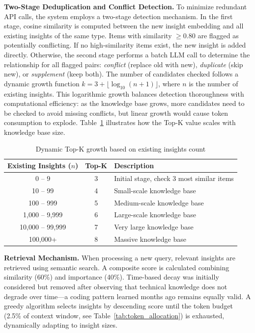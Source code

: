 \documentclass{article} %
\begin{document}
\textbf{Two-Stage Deduplication and Conflict Detection.} To minimize redundant API calls, the system employs a two-stage detection mechanism. In the first stage, cosine similarity is computed between the new insight embedding and all existing insights of the same type. Items with similarity $\geq 0.80$ are flagged as potentially conflicting. If no high-similarity items exist, the new insight is added directly. Otherwise, the second stage performs a batch LLM call to determine the relationship for all flagged pairs: \textit{conflict} (replace old with new), \textit{duplicate} (skip new), or \textit{supplement} (keep both). The number of candidates checked follows a dynamic growth function $k = 3 + \lfloor\log_{10}(n + 1)\rfloor$, where $n$ is the number of existing insights. This logarithmic growth balances detection thoroughness with computational efficiency: as the knowledge base grows, more candidates need to be checked to avoid missing conflicts, but linear growth would cause token consumption to explode. Table~\ref{tab:topk} illustrates how the Top-K value scales with knowledge base size.

\begin{table}[H]
\caption{Dynamic Top-K growth based on existing insights count}
\label{tab:topk}
\begin{center}
\begin{tabular}{ccp{6cm}}
\toprule
\textbf{Existing Insights ($n$)} & \textbf{Top-K} & \textbf{Description} \\
\midrule
0 -- 9 & 3 & Initial stage, check 3 most similar items \\
10 -- 99 & 4 & Small-scale knowledge base \\
100 -- 999 & 5 & Medium-scale knowledge base \\
1,000 -- 9,999 & 6 & Large-scale knowledge base \\
10,000 -- 99,999 & 7 & Very large knowledge base \\
100,000+ & 8 & Massive knowledge base \\
\bottomrule
\end{tabular}
\end{center}
\end{table}

\textbf{Retrieval Mechanism.} When processing a new query, relevant insights are retrieved using semantic search. A composite score is calculated combining similarity (60\%) and importance (40\%). Time-based decay was initially considered but removed after observing that technical knowledge does not degrade over time---a coding pattern learned months ago remains equally valid. A greedy algorithm selects insights by descending score until the token budget (2.5\% of context window, see Table~\ref{tab:token_allocation}) is exhausted, dynamically adapting to insight sizes.
\end{document}
